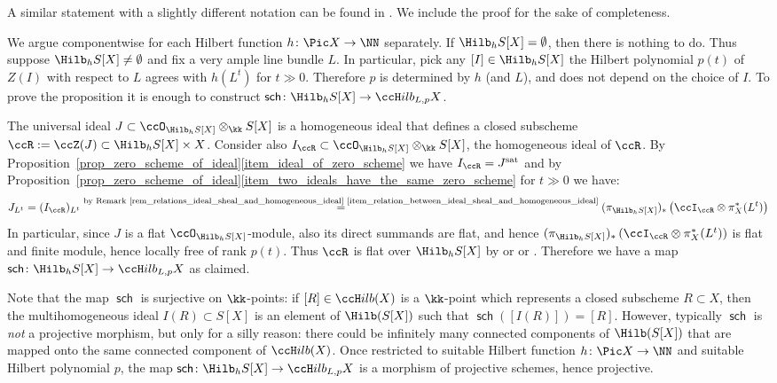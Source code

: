 \documentclass[12pt,a4paper]{article}
\newcommand{\usualHilb}{{\ccH}ilb}
\DeclareMathOperator{\sat}{sat}
\DeclareMathOperator{\sch}{\mathsf {sch}}
\begin{document}
A similar statement with a slightly different notation can be found in \cite[\S2.4.1]{jelisiejew_mandziuk_limits_of_saturated_ideals}.
We include the proof for the sake of completeness.
\begin{prf}
   We argue componentwise for each Hilbert function $h \colon \Pic X \to \NN$ separately.
   If $\Hilb_h S[X]  =\emptyset$, then there is nothing to do.
   Thus suppose $\Hilb_h S[X] \neq \emptyset$ and fix a very ample line bundle $L$.
   In particular, pick any $[I]\in \Hilb_h S[X]$
   the Hilbert polynomial $p(t)$ of $Z(I)$ with respect to $L$ agrees with $h(L^{t})$ for $t\gg 0$.
   Therefore $p$ is determined by $h$ (and $L$), and does not depend on the choice of $I$.
   To prove the proposition it is enough to construct $\sch\colon \Hilb_h S[X] \to \usualHilb_{L,p} X$.

   The universal ideal
   $J\subset \ccO_{\Hilb_h S[X]} \otimes_{\kk} S[X]$ is a homogeneous ideal that
   defines a closed subscheme $\ccR:=\ccZ(J)\subset \Hilb_h S[X]\times X$.
   Consider also $I_\ccR\subset \ccO_{\Hilb_h S[X]} \otimes_{\kk} S[X]$, the homogeneous ideal of $\ccR$.
   By Proposition~\ref{prop_zero_scheme_of_ideal}\ref{item_ideal_of_zero_scheme}
   we have $I_\ccR = J^{\sat}$ and by
   Proposition~\ref{prop_zero_scheme_of_ideal}\ref{item_two_ideals_have_the_same_zero_scheme}
   for $t\gg 0$ we have:
   \[
     J_{L^t} = (I_\ccR)_{L^t}  \stackrel{\text{by Remark~\ref{rem_relations_ideal_sheal_and_homogeneous_ideal}
         \ref{item_relation_between_ideal_sheal_and_homogeneous_ideal}} }{=} (\pi_{\Hilb_h S[X]})_* \left(\ccI_{\ccR}\otimes \pi_X^*(L^{t})\right)
   \]
   In particular, since $J$ is a flat $\ccO_{\Hilb_h S[X]}$-module, also its direct summands are flat, and hence $(\pi_{\Hilb_h S[X]})_* \left(\ccI_{\ccR}\otimes \pi_X^*(L^{t})\right)$ is flat and finite module, hence locally free of rank $p(t)$.
   Thus $\ccR$ is
     flat over $\Hilb_h S[X]$
   by \cite[Prop.~III.9.9]{hartshorne} or \cite[Lem.~5.5]{fantechi_et_al_fundamental_ag} or \cite[Exercise~24.7.C(b)]{vakil_FoAG}.
   Therefore we have a map  $\sch\colon \Hilb_h S[X] \to \usualHilb_{L,p} X$ as claimed.
\end{prf}

Note that the map $\sch$ is surjective on $\kk$-points: if $[R]\in \usualHilb(X)$ is a $\kk$-point which represents a closed subscheme $R\subset X$, then the multihomogeneous ideal $I(R) \subset S[X]$ is an element of $\Hilb(S[X])$ such that $\sch([I(R)]) = [R]$.
However, typically $\sch$ is \emph{not}
a projective morphism,
but only for a silly reason: there could be infinitely many connected components of $\Hilb(S[X])$ that are mapped onto the same connected component of $\usualHilb(X)$.
Once restricted to suitable Hilbert function $h \colon \Pic X\to \NN$ and suitable Hilbert polynomial $p$, the map
$\sch\colon \Hilb_h S[X] \to \usualHilb_{L,p} X$ is a morphism of projective schemes, hence projective.
\end{document}
